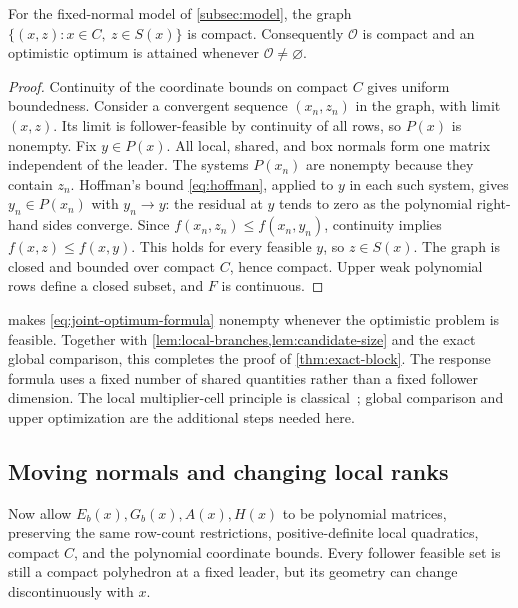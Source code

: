 \begin{lemma}\label{lem:closed-response}
For the fixed-normal model of \cref{subsec:model}, the graph
$\{(x,z):x\in C,\ z\in S(x)\}$ is compact. Consequently
$\mathcal O$ is compact and an optimistic optimum is attained whenever
$\mathcal O\ne\varnothing$.
\end{lemma}
\begin{proof}
Continuity of the coordinate bounds on compact $C$ gives uniform
boundedness. Consider a convergent sequence $(x_n,z_n)$ in the graph,
with limit $(x,z)$. Its limit is follower-feasible by continuity of all
rows, so $P(x)$ is nonempty. Fix $y\in P(x)$. All local, shared, and
box normals form one matrix independent of the leader. The systems
$P(x_n)$ are nonempty because they contain $z_n$. Hoffman's bound
\eqref{eq:hoffman}, applied to $y$ in each such system, gives
$y_n\in P(x_n)$ with $y_n\to y$: the residual at $y$ tends to zero
as the polynomial right-hand sides converge. Since
$f(x_n,z_n)\le f(x_n,y_n)$, continuity implies
$f(x,z)\le f(x,y)$. This holds for every feasible $y$, so $z\in S(x)$.
The graph is closed and bounded over compact $C$, hence compact.
Upper weak polynomial rows define a closed subset, and $F$ is continuous.
\end{proof}

 makes \eqref{eq:joint-optimum-formula}
nonempty whenever the optimistic problem is feasible. Together with
\cref{lem:local-branches,lem:candidate-size} and the exact global
comparison, this completes the proof of \cref{thm:exact-block}.
The response formula uses a fixed number of shared quantities rather
than a fixed follower dimension. The local multiplier-cell principle
is classical~\cite{MegiddoTamir1993}; global comparison and upper
optimization are the additional steps needed here.

\subsection{Moving normals and changing local ranks}\label{subsec:moving-normals}

Now allow $E_b(x),G_b(x),A(x),H(x)$ to be polynomial matrices, preserving
the same row-count restrictions, positive-definite local quadratics,
compact $C$, and the polynomial coordinate bounds. Every follower
feasible set is still a compact polyhedron at a fixed leader, but its
geometry can change discontinuously with $x$.


